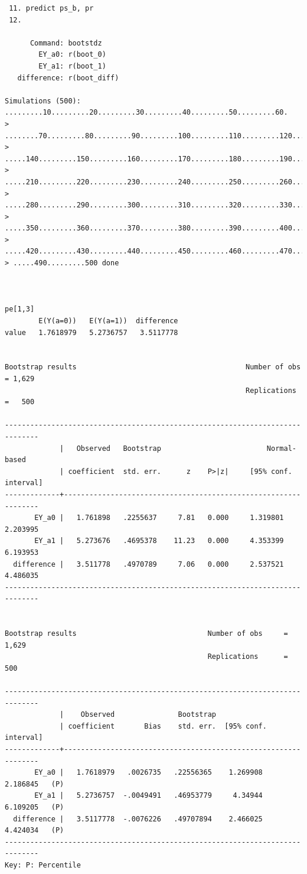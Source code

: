 \documentclass[
  10pt,
  a4paper,
]{book}
\begin{document}
\begin{verbatim}
 11. predict ps_b, pr
 12. 

      Command: bootstdz
        EY_a0: r(boot_0)
        EY_a1: r(boot_1)
   difference: r(boot_diff)

Simulations (500): .........10.........20.........30.........40.........50.........60.
> ........70.........80.........90.........100.........110.........120.........130....
> .....140.........150.........160.........170.........180.........190.........200....
> .....210.........220.........230.........240.........250.........260.........270....
> .....280.........290.........300.........310.........320.........330.........340....
> .....350.........360.........370.........380.........390.........400.........410....
> .....420.........430.........440.........450.........460.........470.........480....
> .....490.........500 done



pe[1,3]
        E(Y(a=0))   E(Y(a=1))  difference
value   1.7618979   5.2736757   3.5117778


Bootstrap results                                        Number of obs = 1,629
                                                         Replications  =   500

------------------------------------------------------------------------------
             |   Observed   Bootstrap                         Normal-based
             | coefficient  std. err.      z    P>|z|     [95% conf. interval]
-------------+----------------------------------------------------------------
       EY_a0 |   1.761898   .2255637     7.81   0.000     1.319801    2.203995
       EY_a1 |   5.273676   .4695378    11.23   0.000     4.353399    6.193953
  difference |   3.511778   .4970789     7.06   0.000     2.537521    4.486035
------------------------------------------------------------------------------


Bootstrap results                               Number of obs     =      1,629
                                                Replications      =        500

------------------------------------------------------------------------------
             |    Observed               Bootstrap
             | coefficient       Bias    std. err.  [95% conf. interval]
-------------+----------------------------------------------------------------
       EY_a0 |   1.7618979   .0026735   .22556365    1.269908   2.186845   (P)
       EY_a1 |   5.2736757  -.0049491   .46953779     4.34944   6.109205   (P)
  difference |   3.5117778  -.0076226   .49707894    2.466025   4.424034   (P)
------------------------------------------------------------------------------
Key: P: Percentile
\end{verbatim}
\end{document}

